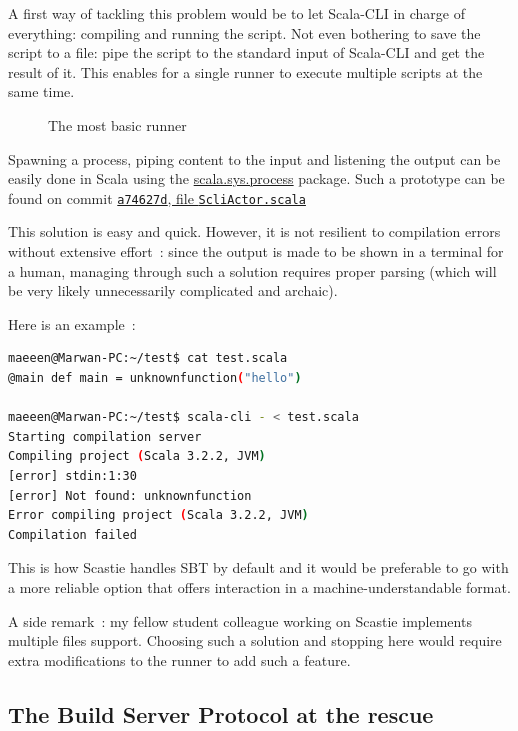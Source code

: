 \documentclass{article}
\begin{document}
A first way of tackling this problem would be to let Scala-CLI in charge of everything: compiling and running the script. Not even bothering to save the script to a file: pipe the script to the standard input of Scala-CLI and get the result of it. This enables for a single runner to execute multiple scripts at the same time.

\begin{figure}[h!]
    \centering
    
    \caption{The most basic runner}
\end{figure}

Spawning a process, piping content to the input and listening the output can be easily done in Scala using the \href{https://dotty.epfl.ch/api/scala/sys/process.html}{scala.sys.process} package. Such a prototype can be found on commit \href{https://github.com/Maeeen/scastie/blob/a74627d080f70f664931133632f06f514a2856f8/scli-runner/src/main/scala/com.olegych.scastie.sclirunner/ScliActor.scala}{\lstinline{a74627d}, file \lstinline{ScliActor.scala}}

This solution is easy and quick. However, it is not resilient to compilation errors without extensive effort~: since the output is made to be shown in a terminal for a human, managing through such a solution requires proper parsing (which will be very likely unnecessarily complicated and archaic).

Here is an example~: 

\begin{lstlisting}[language=bash,frame=tb,basicstyle={\small\ttfamily},frame=single]
maeeen@Marwan-PC:~/test$ cat test.scala
@main def main = unknownfunction("hello")

maeeen@Marwan-PC:~/test$ scala-cli - < test.scala
Starting compilation server
Compiling project (Scala 3.2.2, JVM)
[error] stdin:1:30
[error] Not found: unknownfunction
Error compiling project (Scala 3.2.2, JVM)
Compilation failed
\end{lstlisting}

This is how Scastie handles SBT by default and it would be preferable to go with a more reliable option that offers interaction in a machine-understandable format.

A side remark~: my fellow student colleague working on Scastie implements multiple files support. Choosing such a solution and stopping here would require extra modifications to the runner to add such a feature.

\subsection{The Build Server Protocol at the rescue}
\end{document}
